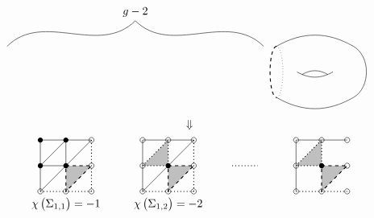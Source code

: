 {$$\begin{tikzpicture}[scale=0.8]
\draw [dotted] (5.5, 1) arc (90:-90:0.25 and 1);
\draw [dashed, thick] (5.5, 1) arc (90:270:0.25 and 1);
\draw (5.5, 1) to [bend left=30] (8.5, 1);
\draw (5.5, -1) to [bend right=30] (8.5, -1);
\draw (6.3, 0) to [bend right=30] (7.7, 0);
\draw (6.5, -0.1) to [bend left=30] (7.5, -0.1);
\draw (8.5, 1) to [bend left=60] (8.5, -1);
\draw (0, 2) node[above]{$ g - 2 $};
\draw (-5, 1) to [out=45, in=-135] (0, 2);
\draw (5, 1) to [out=135, in=-45] (0, 2);
\end{tikzpicture}
$$
$$ \Downarrow $$
$$
\begin{tikzpicture}[scale=0.8]
\fill [lightgray] (-7, 0) to (-6, 0) to (-7, -1) to cycle;
\draw [dashed, thick] (-7, 0) to (-6, 0) to (-7, -1) to cycle;
\fill (-8, 1) circle (0.1);
\fill (-7, 1) circle (0.1);
\draw (-6, 1) circle (0.1);
\fill (-8, 0) circle (0.1);
\fill (-7, 0) circle (0.1);
\draw (-6, 0) circle (0.1);
\draw (-8, -1) circle (0.1);
\draw (-7, -1) circle (0.1);
\draw (-6, -1) circle (0.1);
\draw (-8, 1) to (-6, 1);
\draw (-8, 0) to (-7, 0);
\draw [dotted, thick] (-8, -1) to (-6, -1);
\draw (-8, 1) to (-8, -1);
\draw (-7, 1) to (-7, 0);
\draw [dotted, thick] (-6, 1) to (-6, -1);
\draw (-8, 0) to (-7, 1);
\draw (-8, -1) to (-6, 1);
\draw (-7, -1.5) node{$ \chi\br{\Sigma_{1, 1}} = -1 $};
\fill [lightgray] (-4, 0) to (-3, 1) to (-3, 0) to cycle;
\draw [dotted, thick] (-4, 0) to (-3, 1) to (-3, 0) to cycle;
\fill [lightgray] (-3, 0) to (-2, 0) to (-3, -1) to cycle;
\draw [dashed, thick] (-3, 0) to (-2, 0) to (-3, -1) to cycle;
\draw (-4, 1) circle (0.1);
\draw (-3, 1) circle (0.1);
\draw (-2, 1) circle (0.1);
\draw (-4, 0) circle (0.1);
\fill (-3, 0) circle (0.1);
\draw (-2, 0) circle (0.1);
\draw (-4, -1) circle (0.1);
\draw (-3, -1) circle (0.1);
\draw (-2, -1) circle (0.1);
\draw (-4, 1) to (-2, 1);
\draw [dotted, thick] (-4, -1) to (-2, -1);
\draw (-4, 1) to (-4, -1);
\draw [dotted, thick] (-2, 1) to (-2, -1);
\draw (-4, -1) to (-2, 1);
\draw (-3, -1.5) node{$ \chi\br{\Sigma_{1, 2}} = -2 $};
\draw [dotted, thick] (-0.5, 0) to (0.5, 0);
\fill [lightgray] (2, 0) to (3, 1) to (3, 0) to cycle;
\draw [dotted, thick] (2, 0) to (3, 1) to (3, 0) to cycle;
\fill [lightgray] (3, 0) to (4, 0) to (3, -1) to cycle;
\draw [dashed, thick] (3, 0) to (4, 0) to (3, -1) to cycle;
\draw (2, 1) circle (0.1);
\draw (3, 1) circle (0.1);
\draw (4, 1) circle (0.1);
\draw (2, 0) circle (0.1);
\fill (3, 0) circle (0.1);
\draw (4, 0) circle (0.1);
\draw (2, -1) circle (0.1);
\draw (3, -1) circle (0.1);
\draw (4, -1) circle (0.1);
\draw (2, 1) to (4, 1);
\draw [dotted, thick] (2, -1) to (4, -1);
\draw (2, 1) to (2, -1);

\end{tikzpicture}$$}
